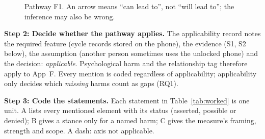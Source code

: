 \documentclass[sigconf,nonacm,natbib=false]{acmart}
\begin{document}
\begin{figure}[h]
\centering
{}
\caption{Pathway F1. An arrow means \enquote{can lead to}, not \enquote{will
lead to}; the inference may also be wrong.}
\label{fig:example-path}
\end{figure}

\textbf{Step 2: Decide whether the pathway applies.} The applicability record
notes the required feature (cycle records stored on the phone), the evidence
(S1, S2 below), the assumption (another person sometimes uses the unlocked
phone) and the decision: \emph{applicable}. Psychological harm and the
relationship tag therefore apply to App~F. Every mention is coded regardless
of applicability; applicability only decides which \emph{missing} harms count
as gaps (RQ1).

\textbf{Step 3: Code the statements.} Each statement in
Table~\ref{tab:worked} is one unit. A lists every mentioned element with its
status (asserted, possible or denied); B gives a stance only for a named harm;
C gives the measure's framing, strength and scope. A dash: axis not applicable.
\end{document}
